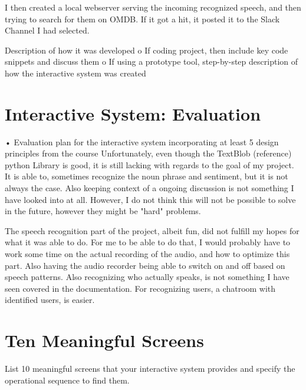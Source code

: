 \documentclass[11pt,fleqn]{book} %
\begin{document}
I then created a local webserver serving the incoming recognized speech, and then trying to search for them on OMDB. If it got a hit, it posted it to the Slack Channel I had selected.

Description of how it was developed
o	If coding project, then include key code snippets and discuss them
o	If using a prototype tool, step-by-step description of how the interactive system was created




\chapter{Interactive System: Evaluation}
•	Evaluation plan for the interactive system incorporating at least 5 design principles from the course
Unfortunately, even though the TextBlob (reference) python Library is good, it is still lacking with regards to the goal of my project.
It is able to, sometimes recognize the noun phrase and sentiment, but it is not always the case.
Also keeping context of a ongoing discussion is not something I have looked into at all.
However, I do not think this will not be possible to solve in the future, however they might be "hard" problems.

The speech recognition part of the project, albeit fun, did not fulfill my hopes for what it was able to do. For me to be able to do that, I would probably have to work some time on the actual recording of the audio, and how to optimize this part. Also having the audio recorder being able to switch on and off based on speech patterns.
Also recognizing who actually speaks, is not something I have seen covered in the documentation.
For recognizing users, a chatroom with identified users, is easier.


\chapter{Ten Meaningful Screens}
List 10 meaningful screens that your interactive system provides and specify the operational sequence to find them.
\end{document}
